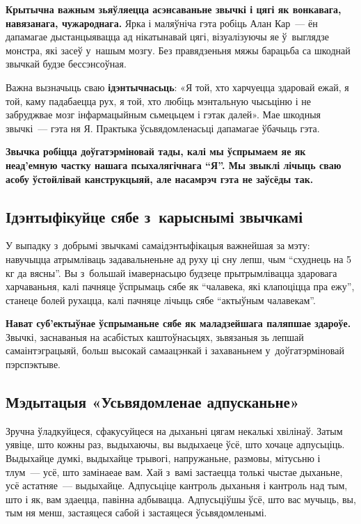 \textbf{Крытычна важным зьяўляецца асэнсаваньне звычкі і цягі як вонкавага, навязанага, чужароднага.} Ярка і маляўніча гэта робіць Алан Кар~--- ён дапамагае дыстанцыявацца ад нікатынавай цягі, візуалізуючы яе ў~выглядзе монстра, які засеў у~нашым мозгу. Без правядзеньня мяжы барацьба са шкоднай звычкай будзе бессэнсоўная.

Важна вызначыць сваю \textbf{ідэнтычнасьць}: «Я той, хто харчуецца здаровай ежай, я той, каму падабаецца рух, я той, хто любіць мэнтальную чысьціню і не забруджвае мозг інфармацыйным сьмецьцем і гэтак далей». Мае шкодныя звычкі~--- гэта ня Я. Практыка ўсьвядомленасьці дапамагае ўбачыць гэта.

\textbf{Звычка робіцца доўгатэрміновай тады, калі мы ўспрымаем яе як неад'емную частку нашага псыхалягічнага ``Я''. Мы звыклі лічыць сваю асобу ўстойлівай канструкцыяй, але насамрэч гэта не заўсёды так.} 

\subsection*{Ідэнтыфікуйце сябе з~карыснымі звычкамі}

У выпадку з~добрымі звычкамі самаідэнтыфікацыя важнейшая за мэту: навучыцца атрымліваць задавальненьне ад руху ці сну лепш, чым ``схуднець на 5 кг да вясны''. Вы з~большай імавернасьцю будзеце прытрымлівацца здаровага харчаваньня, калі пачняце ўспрымаць сябе як ``чалавека, які клапоціцца пра ежу'', станеце болей рухацца, калі пачняце лічыць сябе ``актыўным чалавекам''.

\textbf{Нават суб'ектыўнае ўспрыманьне сябе як маладзейшага паляпшае здароўе.} Звычкі, заснаваныя на асабістых каштоўнасьцях, зьвязаныя зь лепшай самаінтэграцыяй, больш высокай самаацэнкай і захаваньнем у~доўгатэрміновай пэрспэктыве.

\subsection*{Мэдытацыя «Усьвядомленае адпусканьне»}

Зручна ўладкуйцеся, сфакусуйцеся на дыханьні цягам некалькі хвілінаў. Затым уявіце, што кожны раз, выдыхаючы, вы выдыхаеце ўсё, што хочаце адпусьціць. Выдыхайце думкі, выдыхайце трывогі, напружаньне, размовы, мітусьню і тлум~--- усё, што замінаеае вам. Хай з~вамі застаецца толькі чыстае дыханьне, усё астатняе~--- выдыхайце. Адпусьціце кантроль дыханьня і кантроль над тым, што і як, вам здаецца, павінна адбывацца. Адпусьціўшы ўсё, што вас мучыць, вы, тым ня менш, застаяцеся сабой і застаяцеся ўсьвядомленымі.

